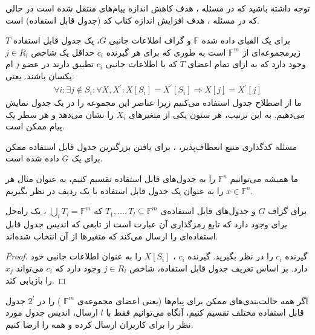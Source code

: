 \begin{observation}
توجه داشته باشید که در مسئله 
\picod،
هدف کاهش اندازه پیام‌های منتقل شده است در حالی که در مسئله 
\psicod
، هدف افزایش اندازه کتاب کد (جدول قابل استفاده) است.
\end{observation}

\begin{definition}
	\label{def1}
برای یک الفبای داده شده
 $\mathbb{F}$
  و گراف اطلاعات جانبی 
 $G$، 
 یک جدول قابل استفاده 
 $T$
  زیرمجموعه‌ای از 
 $\mathbb{F}^m$ 
 است به طوری که برای هر گیرنده 
 $c_i$
 حداقل یک شاخص 
  $j \in R_i$
  وجود دارد که به ازای تمام اعضای
  $T$
  که با اطلاعات جانبی
  $c_i$
  تطبیق دارند در عضو
  $j$
  ام یکسان باشند. یعنی:
\begin{align*}
    \forall i: \exists j \notin S_i: \forall X, X^\prime: X[S_i] = {X^\prime}[S_i]  \Rightarrow X[j] = {X^\prime}[j]
\end{align*}
ما از اصطلاح جدول استفاده می‌کنیم زیرا عناصر این مجموعه را در یک جدول نمایش می‌دهیم. به این ترتیب، هر ستون یکی از متغیرهای $X_i$ را نشان می‌دهد و هر سطر یک پیام ممکن است.
\end{definition}

مسئله کدگذاری منبع انعطاف‌پذیر، 
\psicod
، برای یافتن بزرگترین جدول قابل استفاده ممکن برای یک $G$ داده شده است.

\begin{remark}
    ما همیشه می‌توانیم
     $\mathbb{F}^n$ 
     را به جدول‌های قابل استفاده تقسیم کنیم، به عنوان مثال هر 
     $x \in \mathbb{F}^n$ 
     را به عنوان یک جدول قابل استفاده با یک ردیف در نظر بگیریم.
\end{remark}

\begin{lemma}
    برای گراف $G$ و جدول‌های قابل استفاده‌ی
    $T_1, \ldots, T_l \subseteq \mathbb{F}^m$
     که
     $\bigcup\limits_{i} T_i =  \mathbb{F}^m$
     ، یک راه‌حل برای
     \picod
     وجود دارد که تابع رمزگذاری آن عبارت است از تابعی که اندیس جدول قابل استفاده‌ای را ارسال می‌کند که متغیرها از آن انتخاب شده‌اند.
\end{lemma}
\begin{proof}
    گیرنده $c_i$ را در نظر بگیرید. گیرنده 
    $c_i$
    ،
    $X[S_i]$
    را به عنوان اطلاعات جانبی خود دارد. بر اساس تعریف جدول قابل استفاده، شاخص 
    $j \in R_i$
     وجود دارد که
      $c_i$ 
      می‌تواند
      $x_j$
      را بازیابی کند.
\end{proof}

\begin{corollary}
	\label{cor1}
اگر همه حالت‌بندی‌های ممکن برای پیام‌ها (یعنی اعضای مجموعه‌ی
$\mathbb{F}^m$
) را در 
$2^l$ 
جدول قابل استفاده مختلف تقسیم کنیم، آنگاه می‌توانیم فقط با
$l$ 
ارسال، اندیس جدول مورد نظر را برای کاربران ارسال کرده و همه را ارضا کنیم.
\end{corollary}

